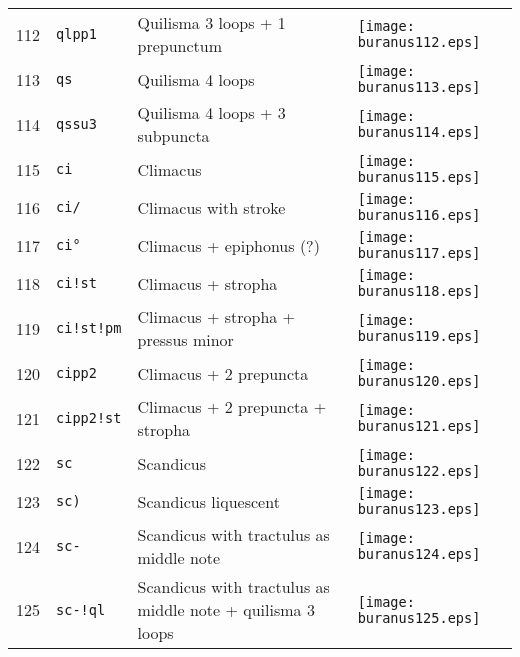 \documentclass{scrarticle}
\begin{document}
\begin{longtable}{l|l|l|l}
112 & \texttt{qlpp1} & Quilisma 3 loops + 1 prepunctum & \texttt{[image: buranus112.eps]} \\
113 & \texttt{qs} & Quilisma 4 loops & \texttt{[image: buranus113.eps]} \\
114 & \texttt{qssu3} & Quilisma 4 loops + 3 subpuncta & \texttt{[image: buranus114.eps]} \\
115 & \texttt{ci} & Climacus & \texttt{[image: buranus115.eps]} \\
116 & \texttt{ci/} & Climacus with stroke & \texttt{[image: buranus116.eps]} \\
117 & \texttt{ci°} & Climacus + epiphonus (?) & \texttt{[image: buranus117.eps]} \\
118 & \texttt{ci!st} & Climacus + stropha & \texttt{[image: buranus118.eps]} \\
119 & \texttt{ci!st!pm} & Climacus + stropha + pressus minor & \texttt{[image: buranus119.eps]} \\
120 & \texttt{cipp2} & Climacus + 2 prepuncta & \texttt{[image: buranus120.eps]} \\
121 & \texttt{cipp2!st} & Climacus + 2 prepuncta + stropha & \texttt{[image: buranus121.eps]} \\
122 & \texttt{sc} & Scandicus & \texttt{[image: buranus122.eps]} \\
123 & \texttt{sc)} & Scandicus liquescent & \texttt{[image: buranus123.eps]} \\
124 & \texttt{sc-} & Scandicus with tractulus as middle note & \texttt{[image: buranus124.eps]} \\
125 & \texttt{sc-!ql} & Scandicus with tractulus as middle note + quilisma 3 loops & \texttt{[image: buranus125.eps]} \\\end{longtable}
\end{document}
